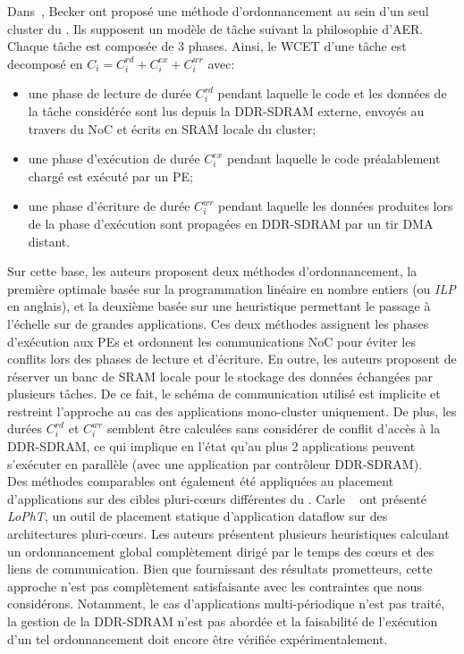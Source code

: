 \documentclass[main.tex]{subfiles}
\begin{document}
Dans~\cite{Becker16}, Becker \etal ont proposé une méthode d'ordonnancement au sein d'un seul cluster du \mppalong. Ils supposent un modèle de tâche suivant la philosophie d'AER. Chaque tâche est composée de 3 phases. Ainsi, le WCET d'une tâche est decomposé en $C_i = C_i^{rd} + C_i^{ex} + C_i^{wr}$ avec:
\begin{itemize}
    \item une phase de lecture de durée $C_i^{rd}$ pendant laquelle le code et les données de la tâche considérée sont lus depuis la DDR-SDRAM externe, envoyés au travers du NoC et écrits en SRAM locale du cluster;
    \item une phase d'exécution de durée $C_i^{ex}$ pendant laquelle le code préalablement chargé est exécuté par un PE;
    \item une phase d'écriture de durée $C_i^{wr}$ pendant laquelle les données produites lors de la phase d'exécution sont propagées en DDR-SDRAM par un tir DMA distant.
\end{itemize}
Sur cette base, les auteurs proposent deux méthodes d'ordonnancement, la première optimale basée sur la programmation linéaire en nombre entiers (ou \emph{ILP} en anglais), et la deuxième basée sur une heuristique permettant le passage à l'échelle sur de grandes applications. Ces deux méthodes assignent les phases d'exécution aux PEs et ordonnent les communications NoC pour éviter les conflits lors des phases de lecture et d'écriture. En outre, les auteurs proposent de réserver un banc de SRAM locale pour le stockage des données échangées par plusieurs tâches. De ce fait, le schéma de communication utilisé est implicite et restreint l'approche au cas des applications mono-cluster uniquement. De plus, les durées $C_i^{rd}$ et $C_i^{wr}$ semblent être calculées sans considérer de conflit d'accès à la DDR-SDRAM, ce qui implique en l'état qu'au plus 2 applications peuvent s'exécuter en parallèle (avec une application par contrôleur DDR-SDRAM). \\


Des méthodes comparables ont également été appliquées au placement d'applications sur des cibles pluri-c\oe{}urs différentes du \mppalong. Carle \etal~\cite{Carle2014} ont présenté \emph{LoPhT}, un outil de placement statique d'application dataflow sur des architectures pluri-c\oe{}urs. Les auteurs présentent plusieurs heuristiques calculant un ordonnancement global complètement dirigé par le temps des c\oe{}urs et des liens de communication. Bien que fournissant des résultats prometteurs, cette approche n'est pas complètement satisfaisante avec les contraintes que nous considérons. Notamment, le cas d'applications multi-périodique n'est pas traité, la gestion de la DDR-SDRAM n'est pas abordée et la faisabilité de l'exécution d'un tel ordonnancement doit encore être vérifiée expérimentalement.
\end{document}
